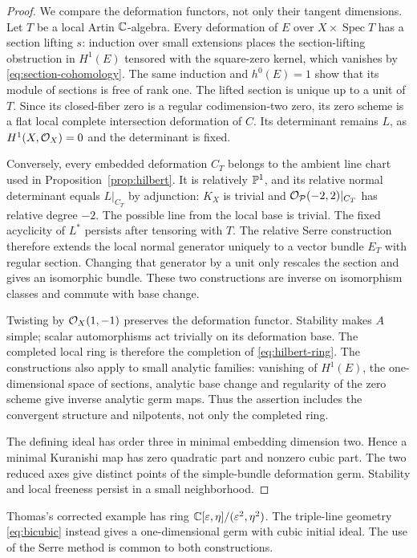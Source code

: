 \begin{proof}
We compare the deformation functors, not only their tangent
dimensions. Let $T$ be a local Artin $\mathbb C$-algebra.
Every deformation of $E$ over $X\times\operatorname{Spec}T$
has a section lifting $s$: induction over small extensions
places the section-lifting obstruction in $H^1(E)$ tensored
with the square-zero kernel, which vanishes by
\eqref{eq:section-cohomology}. The same induction and $h^0(E)=1$
show that its module of sections is free of rank one.
The lifted section is unique up to a unit of $T$.
Since its closed-fiber zero is a regular codimension-two zero,
its zero scheme is a flat local complete intersection deformation
of $C$. Its determinant remains $L$, as
$H^1(X,\mathcal O_X)=0$ and the determinant is fixed.

Conversely, every embedded deformation $C_T$ belongs to the ambient
line chart used in Proposition~\ref{prop:hilbert}. It is relatively
$\mathbb P^1$, and its relative normal determinant equals $L|_{C_T}$
by adjunction: $K_X$ is trivial and
$\mathcal O_{\mathcal P}(-2,2)|_{C_T}$ has relative degree $-2$.
The possible line from the local base is trivial.
The fixed acyclicity of $L^*$ persists after tensoring with $T$.
The relative Serre construction therefore extends the local normal
generator uniquely to a vector bundle $E_T$ with regular section.
Changing that generator by a unit only rescales the section and
gives an isomorphic bundle. These two constructions are inverse
on isomorphism classes and commute with base change.

Twisting by $\mathcal O_X(1,-1)$ preserves the deformation functor.
Stability makes $A$ simple; scalar automorphisms act trivially on
its deformation base. The completed local ring is therefore the
completion of \eqref{eq:hilbert-ring}.
The constructions also apply to small analytic families:
vanishing of $H^1(E)$, the one-dimensional space of sections,
analytic base change and regularity of the zero scheme give
inverse analytic germ maps. Thus the assertion includes the
convergent structure and nilpotents, not only the completed ring.

The defining ideal has order three in minimal embedding dimension
two. Hence a minimal Kuranishi map has zero quadratic part and
nonzero cubic part. The two reduced axes give distinct points of
the simple-bundle deformation germ. Stability and local freeness
persist in a small neighborhood.
\end{proof}

Thomas's corrected example \cite[Addendum]{thomas} has ring
$\mathbb C[\varepsilon,\eta]/(\varepsilon^2,\eta^2)$.
The triple-line geometry \eqref{eq:bicubic} instead gives a
one-dimensional germ with cubic initial ideal. The use of the
Serre method is common to both constructions.

